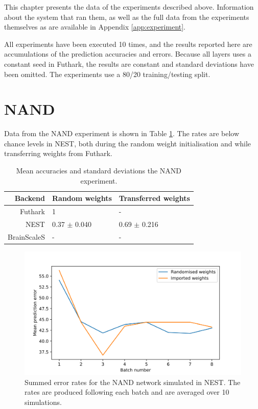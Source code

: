 \documentclass[report.tex]{subfiles}
\begin{document}
This chapter presents the data of the experiments described above.
Information about the system that ran them, as well as the full data from
the experiments themselves as are available in Appendix
\ref{app:experiment}.

All experiments have been executed 10 times, and the results reported here
are accumulations of the prediction accuracies and errors.
Because all layers uses a constant seed in Futhark, the results are constant and
standard deviations have been omitted.
The experiments use a 80/20 training/testing split. 

\section{NAND}

Data from the NAND experiment is shown in Table \ref{tab:xor}.
The rates are below chance levels in NEST, both during
the random weight initialisation and while transferring weights from Futhark.

\def\arraystretch{1.2}%
\begin{table}
  \begin{tabular}{r|l l}
  \label{tab:nand}
  Backend & Random weights & Transferred weights \\ \hline
  Futhark & 1 & - \\
  NEST & 0.37 $\pm$ 0.040 & 0.69 $\pm$ 0.216\\ 
  BrainScaleS & - & -
  \end{tabular}
  \caption{Mean accuracies and standard deviations the NAND experiment.}
  \label{tab:xor}
\end{table}

\begin{figure}
  \includegraphics[width=\linewidth]{images/nand.png}
  \caption{Summed error rates for the NAND network simulated in NEST. The rates
  are produced following each batch and are averaged over 10 simulations.}
  \label{fig:nand_snn}
\end{figure}
\FloatBarrier
\end{document}
